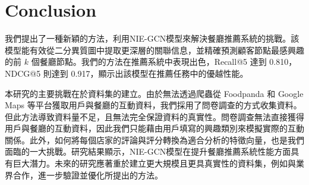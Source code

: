 \section{Conclusion}
我們提出了一種新穎的方法，利用NIE-GCN模型來解決餐廳推薦系統的挑戰。該模型能有效從二分異質圖中提取更深層的關聯信息，並精確預測顧客節點最感興趣的前 $k$ 個餐廳節點。我們的方法在推薦系統中表現出色，Recall@5 達到 0.810，NDCG@5 則達到 0.917，顯示出該模型在推薦任務中的優越性能。

本研究的主要挑戰在於資料集的建立。由於無法透過爬蟲從 Foodpanda 和 Google Maps 等平台獲取用戶與餐廳的互動資料，我們採用了問卷調查的方式收集資料。但此方法導致資料量不足，且無法完全保證資料的真實性。問卷調查無法直接獲得用戶與餐廳的互動資料，因此我們只能藉由用戶填寫的興趣類別來模擬實際的互動關係。此外，如何將每個店家的評論與評分轉換為適合分析的特徵向量，也是我們面臨的一大挑戰。研究結果顯示，NIE-GCN模型在提升餐廳推薦系統性能方面具有巨大潛力。未來的研究應著重於建立更大規模且更具真實性的資料集，例如與業界合作，進一步驗證並優化所提出的方法。
\color{black}